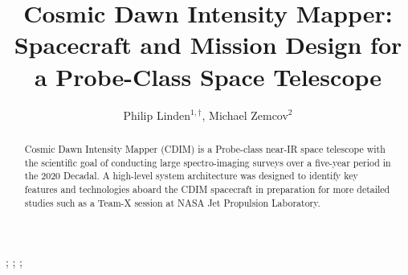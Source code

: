 \documentclass{ws-jai}
\begin{document}
\catchline{}{}{}{}{} %


\title{Cosmic Dawn Intensity Mapper: \\Spacecraft and Mission Design for a Probe-Class Space Telescope}

\author{Philip Linden$^{1,\dagger}$, Michael Zemcov$^{2}$}

\address{
$^{1}$Department of Mechanical Engineering, Kate Gleason College of Engineering, Rochester
Institute of Technology, Rochester, NY 14623, USA, pjl7651@rit.edu\\
$^{2}$Center for Detectors, School of Physics and Astronomy, Rochester
Institute of Technology, Rochester, NY 14623, USA, zemcov@cfd.rit.edu
}

\maketitle


\begin{history}
;
;
;
\end{history}

\begin{abstract}
  Cosmic Dawn Intensity Mapper (CDIM) is a Probe-class near-IR space telescope with the scientific goal of conducting large spectro-imaging surveys over a five-year period in the 2020 Decadal.
  A high-level system architecture was designed to identify key features and technologies aboard the CDIM spacecraft in preparation for more detailed studies such as a Team-X session at NASA Jet Propulsion Laboratory.
\end{abstract}


\end{document}
